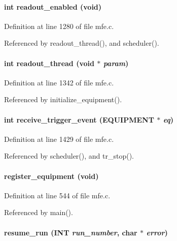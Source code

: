 \paragraph[{readout\_\-enabled}]{\setlength{\rightskip}{0pt plus 5cm}int readout\_\-enabled (void)}\hfill\label{mfe_8c_ab6ce300200eebdc71c6a3d5b3760a1ba}


Definition at line 1280 of file mfe.c.

Referenced by readout\_\-thread(), and scheduler().
\paragraph[{readout\_\-thread}]{\setlength{\rightskip}{0pt plus 5cm}int readout\_\-thread (void $\ast$ {\em param})}\hfill\label{mfe_8c_a1dcae9fe323025ad03d3ec1b5a95263d}


Definition at line 1342 of file mfe.c.

Referenced by initialize\_\-equipment().
\paragraph[{receive\_\-trigger\_\-event}]{\setlength{\rightskip}{0pt plus 5cm}int receive\_\-trigger\_\-event ({\bf EQUIPMENT} $\ast$ {\em eq})}\hfill\label{mfe_8c_a9cd62f651300e81799cae815b51ca654}


Definition at line 1429 of file mfe.c.

Referenced by scheduler(), and tr\_\-stop().
\paragraph[{register\_\-equipment}]{ register\_\-equipment (void)}\hfill\label{mfe_8c_ab834073e5b665fccaa4eff2a61bc9372}


Definition at line 544 of file mfe.c.

Referenced by main().
\paragraph[{resume\_\-run}]{ resume\_\-run ({\bf INT} {\em run\_\-number}, \/  char $\ast$ {\em error})}\hfill\label{mfe_8c_a6cada7e3f07b9fc2b9886263223661d4}


